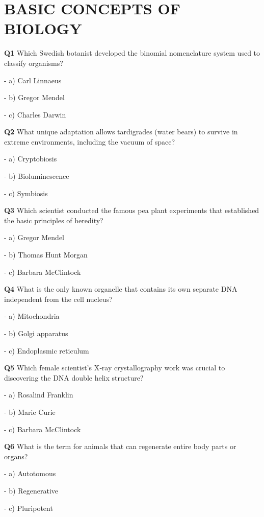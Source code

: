 \section{BASIC CONCEPTS OF BIOLOGY}

\textbf{Q1} Which Swedish botanist developed the binomial nomenclature system used to classify organisms?\par
\quad - a) Carl Linnaeus\par
\quad - b) Gregor Mendel\par
\quad - c) Charles Darwin\par

\textbf{Q2} What unique adaptation allows tardigrades (water bears) to survive in extreme environments, including the vacuum of space?\par
\quad - a) Cryptobiosis\par
\quad - b) Bioluminescence\par
\quad - c) Symbiosis\par

\textbf{Q3} Which scientist conducted the famous pea plant experiments that established the basic principles of heredity?\par
\quad - a) Gregor Mendel\par
\quad - b) Thomas Hunt Morgan\par
\quad - c) Barbara McClintock\par

\textbf{Q4} What is the only known organelle that contains its own separate DNA independent from the cell nucleus?\par
\quad - a) Mitochondria\par
\quad - b) Golgi apparatus\par
\quad - c) Endoplasmic reticulum\par

\textbf{Q5} Which female scientist's X‑ray crystallography work was crucial to discovering the DNA double helix structure?\par
\quad - a) Rosalind Franklin\par
\quad - b) Marie Curie\par
\quad - c) Barbara McClintock\par

\textbf{Q6} What is the term for animals that can regenerate entire body parts or organs?\par
\quad - a) Autotomous\par
\quad - b) Regenerative\par
\quad - c) Pluripotent\par

